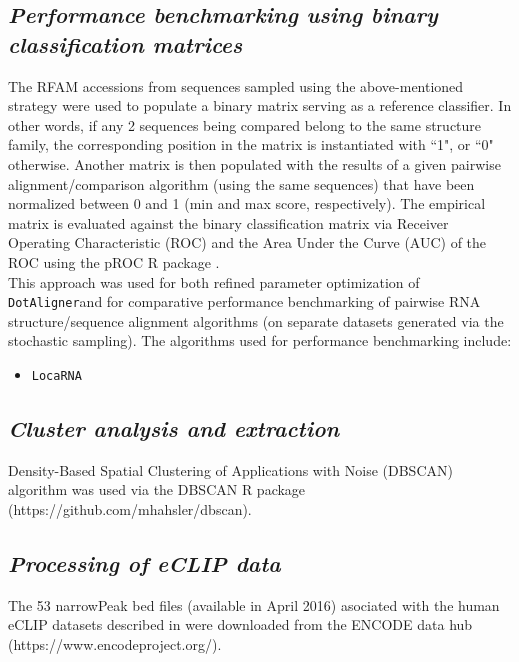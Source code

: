 \documentclass[a4paper,twoside]{article}
\newcommand\dotaligner{\texttt{DotAligner}}
\newcommand\locarna{\texttt{LocaRNA}}
\begin{document}
\subsection{\textit{ Performance benchmarking using binary classification matrices}}
The RFAM accessions from sequences sampled using the above-mentioned strategy were used to populate a binary matrix 
serving as a reference classifier. In other words, if any 2 sequences being compared belong to the same structure family,
the corresponding position in the matrix is instantiated with ``1", or ``0" otherwise. Another matrix is then populated with the 
results of a given pairwise alignment/comparison  algorithm (using the same sequences) that have been normalized between 0 and 1 
(min and max score, respectively). The empirical matrix is evaluated against the binary classification matrix via Receiver 
Operating Characteristic (ROC) and the Area Under the Curve (AUC) of the ROC using the pROC R package \cite{robin2011proc}. \\

This approach was used for both refined parameter optimization of \dotaligner and for comparative performance benchmarking of 
pairwise RNA structure/sequence alignment algorithms (on separate datasets generated via the stochastic sampling).  The algorithms 
used for performance benchmarking include: 
\begin{itemize}
\item \locarna{} 

\end{itemize}

\subsection{\textit{ Cluster analysis and extraction }}

Density-Based Spatial Clustering of Applications with Noise (DBSCAN) algorithm \cite{ester1996density} was used via the DBSCAN  R package (https://github.com/mhahsler/dbscan). 


\subsection{\textit{ Processing of eCLIP data }}
The 53 narrowPeak bed files (available in April 2016) asociated with the human eCLIP datasets described in 
\cite{van2016robust} were downloaded from the ENCODE data hub (https://www.encodeproject.org/). 
\end{document}
